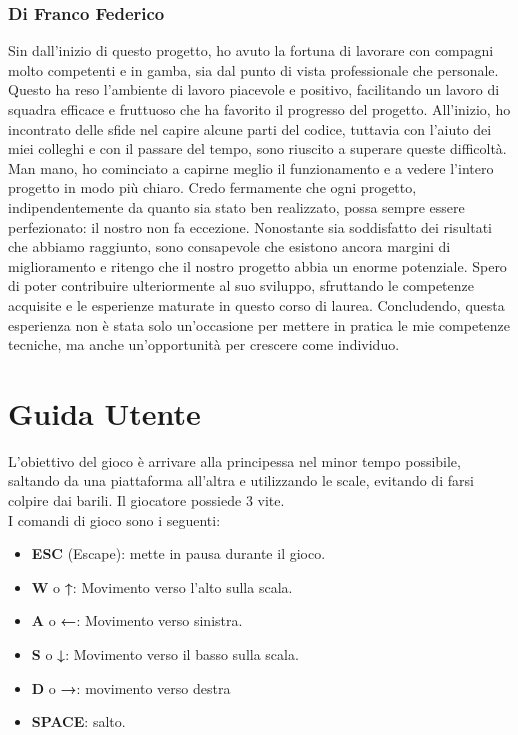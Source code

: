 \documentclass[a4paper,12pt]{report}
\begin{document}
\subsection*{Di Franco Federico}
Sin dall’inizio di questo progetto, ho avuto la fortuna di lavorare con compagni molto competenti e in gamba, sia dal punto di vista professionale che personale. Questo ha reso l'ambiente di lavoro piacevole e positivo, facilitando un lavoro di squadra efficace e fruttuoso che ha favorito il progresso del progetto. All'inizio, ho incontrato delle sfide nel capire alcune parti del codice, tuttavia con l'aiuto dei miei colleghi e con il passare del tempo, sono riuscito a superare queste difficoltà. Man mano, ho cominciato a capirne meglio il funzionamento e a vedere l'intero progetto in modo più chiaro. Credo fermamente che ogni progetto, indipendentemente da quanto sia stato ben realizzato, possa sempre essere perfezionato: il nostro non fa eccezione. Nonostante sia soddisfatto dei risultati che abbiamo raggiunto, sono consapevole che esistono ancora margini di miglioramento e ritengo che il nostro progetto abbia un enorme potenziale. Spero di poter contribuire ulteriormente al suo sviluppo, sfruttando le competenze acquisite e le esperienze maturate in questo corso di laurea. Concludendo, questa esperienza non è stata solo un'occasione per mettere in pratica le mie competenze tecniche, ma anche un'opportunità per crescere come individuo.

\appendix{}
\chapter{Guida Utente}

L'obiettivo del gioco è arrivare alla principessa nel minor tempo possibile, saltando da una piattaforma all'altra e utilizzando le scale, evitando di farsi colpire dai barili. Il giocatore possiede 3 vite.
\\

I comandi di gioco sono i seguenti:
\begin{itemize}
    \item \textbf{ESC} (Escape): mette in pausa durante il gioco.
    \item \textbf{W} o \textbf{↑}: Movimento verso l'alto sulla scala.
    \item \textbf{A} o \textbf{←}: Movimento verso sinistra.
    \item \textbf{S} o \textbf{↓}: Movimento verso il basso sulla scala.
    \item \textbf{D} o \textbf{→}: movimento verso destra
    \item \textbf{SPACE}: salto.
\end{itemize}
\end{document}
